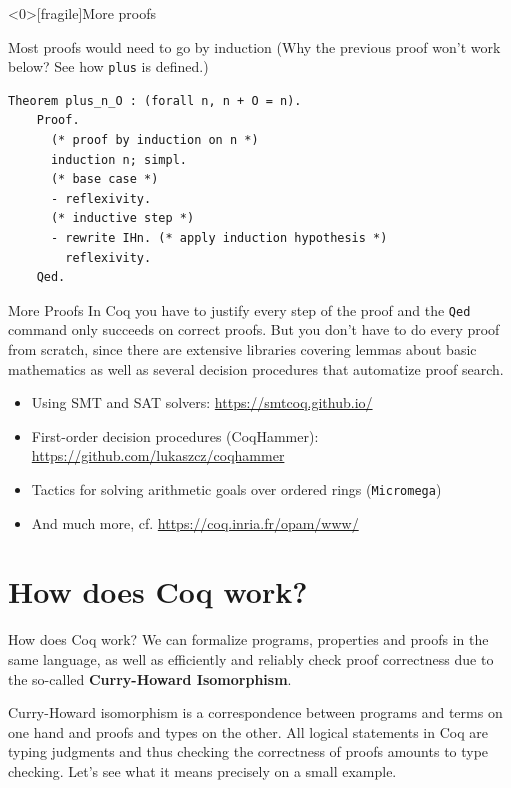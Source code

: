 \documentclass[10pt]{beamer}
\begin{document}
\begin{frame}<0>[fragile]{More proofs}

  Most proofs would need to go by induction (Why the previous proof won't work below? See how \texttt{plus} is defined.)

  \begin{lstlisting}[language=Coq]
    Theorem plus_n_O : (forall n, n + O = n).
    Proof.
      (* proof by induction on n *)
      induction n; simpl.
      (* base case *)
      - reflexivity.
      (* inductive step *)
      - rewrite IHn. (* apply induction hypothesis *)
        reflexivity.
    Qed.

  \end{lstlisting}
\end{frame}
\begin{frame}{More Proofs}
     In Coq you have to justify every step of the proof and the \texttt{Qed} command only succeeds on correct proofs. But you don't have to do every proof from scratch, since there are extensive libraries covering lemmas about basic mathematics as well as several decision procedures that automatize proof search.
     \begin{itemize}
     \item Using SMT and SAT solvers: \url{https://smtcoq.github.io/}
     \item First-order decision procedures (CoqHammer): \url{https://github.com/lukaszcz/coqhammer}
     \item Tactics for solving arithmetic goals over ordered rings (\texttt{Micromega})
       \item And much more, cf. \url{https://coq.inria.fr/opam/www/}
       \end{itemize}
  
\end{frame}

   \section{How does Coq work?}
\begin{frame}{How does Coq work?}
    We can formalize programs, properties and proofs in the same language, as well as efficiently and reliably check proof correctness due to the so-called {\bf Curry-Howard Isomorphism}.

    Curry-Howard isomorphism is a correspondence between programs and terms on one hand and proofs and types on the other. All logical statements in Coq are typing judgments and thus checking the correctness of proofs amounts to type checking. Let's see what it means precisely on a small example.
   \end{frame}
   
\end{document}
